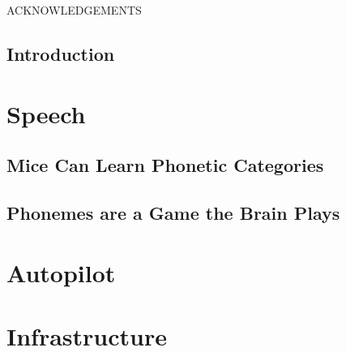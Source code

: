 \begingroup
\hypersetup{%
	linkcolor = Black,
	urlcolor = Black,
	citecolor = Black,
}



\addtocounter{page}{1}







\clearpage
\begin{center}
ACKNOWLEDGEMENTS
\end{center}



\tableofcontents

\listoffigures

\listoftables
%
\endgroup

\mainmatter

\chapter{Introduction}





\part{Speech}

\chapter{Mice Can Learn Phonetic Categories}
\label{cha:mice_can_learn}





\chapter{Phonemes are a Game the Brain Plays}



\part{Autopilot}
\label{part:autopilot}



\clearpage







\part{Infrastructure}





